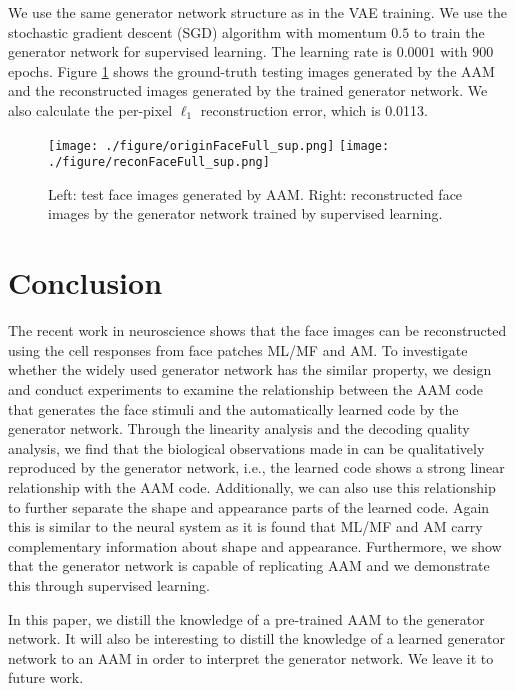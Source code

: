 \documentclass{article}
\begin{document}
We use the same generator network structure as in the VAE training. We use the stochastic gradient descent (SGD) algorithm with momentum $0.5$ to train the generator network for supervised learning. The learning rate is $0.0001$ with $900$ epochs. Figure \ref{fig:AAM_rep} shows the ground-truth testing images generated by the AAM and the reconstructed images generated by the trained generator network. We also calculate the per-pixel $\ell_1$ reconstruction error, which is 0.0113.

\begin{figure}[h]
	\begin{center}
		\texttt{[image: ./figure/originFaceFull\_sup.png]}\hspace{0.5mm}
		\texttt{[image: ./figure/reconFaceFull\_sup.png]}		
		\caption{Left: test face images generated by AAM. Right: reconstructed face images by the generator network trained by supervised learning.}
		\label{fig:AAM_rep}
	\end{center}
\end{figure}

\section{Conclusion}%
The recent work in neuroscience \cite{chang2017code} shows that the face images can be  reconstructed using the cell responses from face patches ML/MF and AM. To investigate whether the widely used generator network has the similar property, we design and conduct experiments to examine the relationship between  the AAM code that generates the face stimuli and the automatically learned code by the generator network. Through the linearity analysis and the decoding quality analysis, we  find that the biological observations made in \cite{chang2017code} can be qualitatively reproduced by the generator network, i.e., the learned code shows a strong linear relationship with the AAM code. Additionally, we can also use this relationship to further separate the shape and appearance parts of the learned code. Again this is similar to the neural system as it is found that ML/MF and AM carry complementary information about shape and appearance. 
Furthermore, we show that the generator network is capable of replicating AAM and we demonstrate this through supervised learning. 

In this paper, we distill the knowledge of a pre-trained AAM to the generator network. It will also be interesting to distill the knowledge of a learned generator network to an AAM in order to interpret the generator network. We leave it to future work. 
\end{document}
